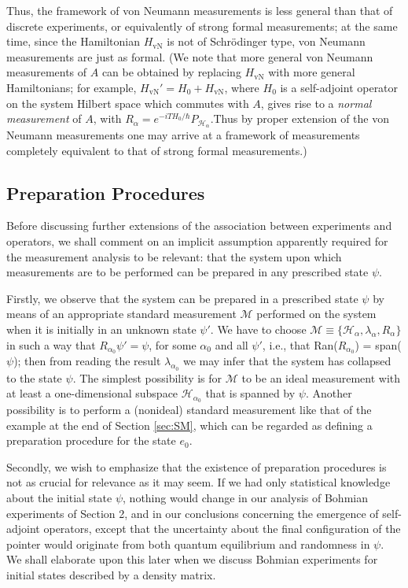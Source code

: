 \documentclass[12pt]{article}
\newcommand{\sa}{self-adjoint}
\renewcommand{\a}{\alpha}
\newcommand{\la}{\lambda_{\a}}
\newcommand{\Ha}{{\H}_{\a}}
\renewcommand{\H}{\mbox{$\mathcal{H}$}}
\newcommand{\Pa}{ P_{ {\mathcal{H}_{\a} } } }
\newcommand{\Aa}{R_{\a}}
\newcommand{\M}{\mbox{$\mathcal{M}$}}
\begin{document}
Thus, the framework of von Neumann measurements is less general than
that of discrete experiments, or equivalently of strong formal
measurements; at the same time, since the Hamiltonian $H_{\text{vN}}$
is not of Schr\"odinger type, von Neumann measurements are just as
formal.  (We note that more general von Neumann measurements of $A$
can be obtained by replacing $H_{\text{vN}}$ with more general
Hamiltonians; for example, $H_{\text{vN}}'= H_{0} + H_{\text{vN}}$,
where $H_0$ is a self-adjoint operator on the system Hilbert space
which commutes with $A$, gives rise to a \emph{normal measurement} of
$A$, with $\Aa = e^{-iT H_0/\hbar}\Pa$.Thus by proper extension of the
von Neumann measurements one may arrive at a framework of measurements
completely equivalent to that of strong formal measurements.)

\subsection{Preparation Procedures}
\label{sec:PP}
Before discussing further extensions of the association between
experiments and operators, we shall comment on an implicit assumption
apparently required for the measurement analysis to be relevant: that
the system upon which measurements are to be performed can be prepared
in any prescribed state $\psi$.

Firstly, we observe that the system can be prepared in a prescribed
state $\psi$ by means of an appropriate standard measurement \M{}
performed on the system when it is initially in an unknown state
$\psi'$.  We have to choose $\M\equiv \{\Ha, \la, \Aa \}$ in such a
way that $R_{\a_{0}}\psi'=\psi$, for some $\a_{0}$ and all $\psi'$,
i.e., that Ran($R_{\a_{0}}$) = span($\psi$); then {}from reading the
result $\lambda_{\a_0}$ we may infer that the system has collapsed to
the state $\psi$.  The simplest possibility is for $\M$ to be an ideal
measurement with at least a one-dimensional subspace $\H_{\a_{0}}$
that is spanned by $\psi$.  Another possibility is to perform a
(nonideal) standard measurement like that of the example at the end of
Section \ref{sec:SM}, which can be regarded as defining a preparation
procedure for the state $e_{0}$.

Secondly, we wish to emphasize that the existence of preparation
procedures is not as crucial for relevance as it may seem.  If we had
only statistical knowledge about the initial state $\psi$, nothing
would change in our analysis of Bohmian experiments of Section 2, and
in our conclusions concerning the emergence of \sa{} operators, except
that the uncertainty about the final configuration of the pointer
would originate {}from both quantum equilibrium and randomness in
$\psi$. We shall elaborate upon this later when we discuss Bohmian
experiments for initial states described by a density matrix.
\end{document}
